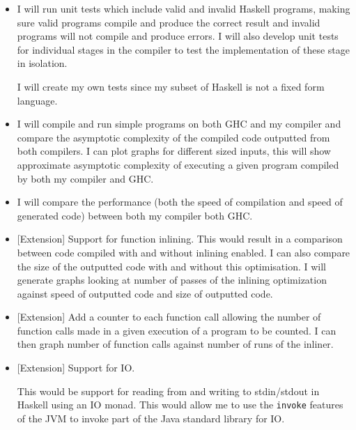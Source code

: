\documentclass[a4paper]{article}
\begin{document}
  \begin{itemize}

    \item
      I will run unit tests which include valid and invalid Haskell programs, making sure valid programs compile and produce the correct result and invalid
      programs will not compile and produce errors. I will also develop unit tests for individual stages in the compiler to test the implementation of these stage
      in isolation.

      I will create my own tests since my subset of Haskell is not a fixed form language.

    \item 

      I will compile and run simple programs on both GHC and my compiler and compare the asymptotic complexity of the 
      compiled code outputted from both compilers. I can plot graphs for different sized inputs, 
      this will show approximate asymptotic complexity of executing a given program compiled by both my compiler and GHC.

    \item

      I will compare the performance (both the speed of compilation and speed of generated code) between both my compiler both GHC.

    \item

      [Extension] Support for function inlining. This would result in a comparison between code compiled with and without inlining enabled. I can also
      compare the size of the outputted code with and without this optimisation. I will generate graphs looking at number of passes of the inlining 
      optimization against speed of outputted code and size of outputted code.

    \item 

      [Extension] Add a counter to each function call allowing the number of function calls made in a given execution of a
      program to be counted. I can then graph number of function calls against number of runs of the inliner.

    \item

      [Extension] Support for IO.

      This would be support for reading from and writing to stdin/stdout in Haskell using an IO monad. This would allow me to use the \texttt{invoke} features
      of the JVM to invoke part of the Java standard library for IO.


\end{itemize}
\end{document}
